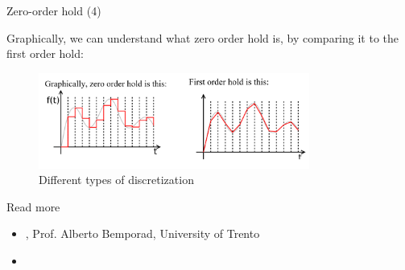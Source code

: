 \documentclass{beamer}
\begin{document}
\begin{frame}{Zero-order hold (4)}
\begin{flushleft}

Graphically, we can understand what zero order hold is, by comparing it to the first order hold:

\begin{figure} [h!]
\begin{center}
\includegraphics[width=3.5in]{ZOH.PNG}
\end{center} 
\caption{Different types of discretization} \label{F:ZOH}
\end{figure}

\end{flushleft}
\end{frame}


%
%
%
%
%
%









\begin{frame}{Read more}

\begin{itemize}
\item  {}, Prof. Alberto Bemporad, University of Trento

\item {}

\end{itemize}

\end{frame}



\myqrframe
\end{document}
